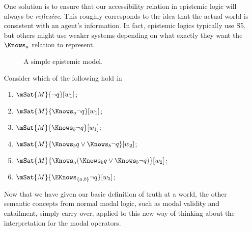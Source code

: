 \documentclass[../../../include/open-logic-section]{subfiles}
\begin{document}
One solution is to ensure that our accessibility relation in epistemic
logic will always be \emph{reflexive}. This roughly corresponds to the
idea that the actual world is consistent with an agent's information.
In fact, epistemic logics typically use S5, but others might use
weaker systems depending on what exactly they want the $\Knows_a$
relation to represent.

\begin{figure}
  \begin{center}
  \end{center}
  \caption{A simple epistemic model.}
\end{figure}

\begin{prob}
  Consider which of the following hold in     \begin{enumerate}
    \item $\mSat{M}{\lnot q}[w_1]$;
    \item $\mSat{M}{\Knows_a \lnot q}[w_1]$;
    \item $\mSat{M}{\Knows_b \lnot q}[w_1]$;
    \item $\mSat{M}{\Knows_b q \lor \Knows_b \lnot q}[w_2]$;
    \item $\mSat{M}{\Knows_a( \Knows_b q \lor \Knows_b \lnot q)}[w_2]$;
    \item $\mSat{M}{\EKnows_{\{a,b\}} \lnot q}[w_3]$;
    \end{enumerate}
\end{prob}

Now that we have given our basic definition of truth at a world, the
other semantic concepts from normal modal logic, such as modal
validity and entailment, simply carry over, applied to this new way of
thinking about the interpretation for the modal operators.
\end{document}
